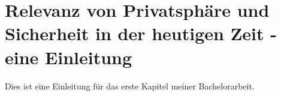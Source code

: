 \chapter{Relevanz von Privatsphäre und Sicherheit in der heutigen Zeit - eine Einleitung} %
\label{Introduction} %

Dies ist eine Einleitung für das erste Kapitel meiner Bachelorarbeit.